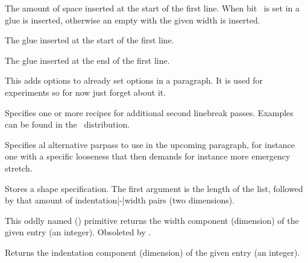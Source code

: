 The amount of space inserted at the start of the first line. When bit \tobit
{}\ is set in  a glue is
inserted, otherwise an empty  with the given width is inserted.

\stopoldprimitive

\startnewprimitive[title={\prm {parinitleftskip}}]

The glue inserted at the start of the first line.

\stopnewprimitive

\startnewprimitive[title={\prm {parinitrightskip}}]

The glue inserted at the end of the first line.

\stopnewprimitive

\startnewprimitive[title={\prm {paroptions}}]

This adds options to already set options in a paragraph. It is used for
experiments so for now just forget about it.

\stopnewprimitive

\startnewprimitive[title={\prm {parpasses}}]

Specifies one or more recipes for additional second linebreak passes. Examples
can be found in the \CONTEXT\ distribution.

\stopnewprimitive

\startnewprimitive[title={\prm {parpassesexception}}]

Specifies al alternative parpass to use in the upcoming paragraph, for instance
one with a specific looseness that then demands for instance more emergency
stretch.

\stopnewprimitive

\startoldprimitive[title={\prm {parshape}}]

Stores a shape specification. The first argument is the length of the list,
followed by that amount of indentation|-|width pairs (two dimensions).

\stopoldprimitive

\startoldprimitive[title={\prm {parshapedimen}}]

This oddly named (\ETEX) primitive returns the width component (dimension) of the
given entry (an integer). Obsoleted by .

\stopoldprimitive

\startoldprimitive[title={\prm {parshapeindent}}]

Returns the indentation component (dimension) of the given entry (an integer).

